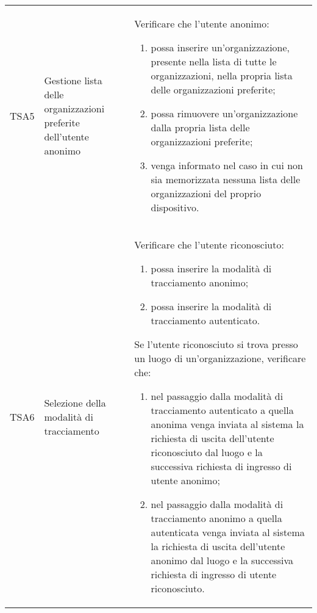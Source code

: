 {\begin{longtable}{ c | C{3cm} | C{11cm} }
TSA5 & Gestione lista delle organizzazioni preferite dell'utente anonimo &
Verificare che l'utente anonimo:
\begin{enumerate}
    \item possa inserire un'organizzazione, presente nella lista di tutte le organizzazioni, nella propria lista delle organizzazioni preferite;
    \item possa rimuovere un'organizzazione dalla propria lista delle organizzazioni preferite;
    \item venga informato nel caso in cui non sia memorizzata nessuna lista delle organizzazioni del proprio dispositivo.
\end{enumerate} \\

TSA6 & Selezione della modalità di tracciamento & 
Verificare che l'utente riconosciuto:
\begin{enumerate}
    \item possa inserire la modalità di tracciamento anonimo;
    \item possa inserire la modalità di tracciamento autenticato.
\end{enumerate}
Se l'utente riconosciuto si trova presso un luogo di un'organizzazione, verificare che:
\begin{enumerate}
    \item nel passaggio dalla modalità di tracciamento autenticato a quella anonima venga inviata al sistema la richiesta di uscita dell'utente riconosciuto dal luogo e la successiva richiesta di ingresso di utente anonimo;
    \item nel passaggio dalla modalità di tracciamento anonimo a quella autenticata venga inviata al sistema la richiesta di uscita dell'utente anonimo dal luogo e la successiva richiesta di ingresso di utente riconosciuto.
\end{enumerate} \\


\end{longtable}}
